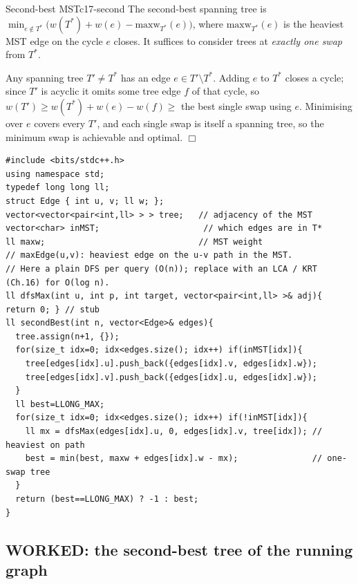 \begin{theorem}{Second-best MST}{c17-second}
The second-best spanning tree is \(\min_{e\notin T^{*}} \big(w(T^{*}) + w(e) -
\mathrm{maxw}_{T^{*}}(e)\big)\), where \(\mathrm{maxw}_{T^{*}}(e)\) is the heaviest MST edge on the
cycle \(e\) closes.  It suffices to consider trees at \emph{exactly one swap} from
\(T^{*}\).
\end{theorem}

\begin{proofbox}
Any spanning tree \(T'\ne T^{*}\) has an edge \(e\in T'\setminus T^{*}\).  Adding
\(e\) to \(T^{*}\) closes a cycle; since \(T'\) is acyclic it omits some tree edge
\(f\) of that cycle, so \(w(T')\ge w(T^{*})+w(e)-w(f)\ge\) the best single swap
using \(e\).  Minimising over \(e\) covers every \(T'\), and each single swap is
itself a spanning tree, so the minimum swap is achievable and optimal. \(\Box\)
\end{proofbox}

\begin{lstlisting}[caption={Second-best MST. Build T* and its maxEdge-on-path via the reconstruction tree / LCA (Ch.16), then for each non-tree edge add weight(T*) + w(e) - maxEdgeOnPath(u,v) and take the strict minimum. Naive path walk is O(mn); LCA makes it O(m log n)}, label={lst:c17-second}]
#include <bits/stdc++.h>
using namespace std;
typedef long long ll;
struct Edge { int u, v; ll w; };
vector<vector<pair<int,ll> > > tree;   // adjacency of the MST
vector<char> inMST;                     // which edges are in T*
ll maxw;                               // MST weight
// maxEdge(u,v): heaviest edge on the u-v path in the MST.
// Here a plain DFS per query (O(n)); replace with an LCA / KRT (Ch.16) for O(log n).
ll dfsMax(int u, int p, int target, vector<pair<int,ll> >& adj){ return 0; } // stub
ll secondBest(int n, vector<Edge>& edges){
  tree.assign(n+1, {});
  for(size_t idx=0; idx<edges.size(); idx++) if(inMST[idx]){
    tree[edges[idx].u].push_back({edges[idx].v, edges[idx].w});
    tree[edges[idx].v].push_back({edges[idx].u, edges[idx].w});
  }
  ll best=LLONG_MAX;
  for(size_t idx=0; idx<edges.size(); idx++) if(!inMST[idx]){
    ll mx = dfsMax(edges[idx].u, 0, edges[idx].v, tree[idx]); // heaviest on path
    best = min(best, maxw + edges[idx].w - mx);               // one-swap tree
  }
  return (best==LLONG_MAX) ? -1 : best;
}
\end{lstlisting}

\subsection{WORKED: the second-best tree of the running graph}

